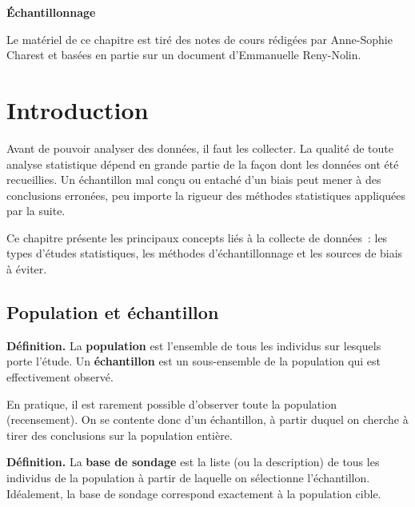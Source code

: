 \documentclass[11pt,french]{article}
\begin{document}
\begin{center}
  {\LARGE\bfseries Échantillonnage}
\end{center}

\medskip
\begin{center}
  \small{Le matériel de ce chapitre est tiré des notes de cours rédigées par Anne-Sophie Charest et basées en partie sur un document d'Emmanuelle Reny-Nolin.}
\end{center}

\bigskip
\tableofcontents

\newpage

\section{Introduction}

Avant de pouvoir analyser des données, il faut les collecter. La qualité de toute analyse
statistique dépend en grande partie de la façon dont les données ont été recueillies. Un
échantillon mal conçu ou entaché d'un biais peut mener à des conclusions erronées, peu
importe la rigueur des méthodes statistiques appliquées par la suite.

Ce chapitre présente les principaux concepts liés à la collecte de données~: les types
d'études statistiques, les méthodes d'échantillonnage et les sources de biais à éviter.

\subsection{Population et échantillon}

\textbf{Définition.} La \textbf{population} est l'ensemble de tous les individus sur lesquels
porte l'étude. Un \textbf{échantillon} est un sous-ensemble de la population qui est
effectivement observé.

En pratique, il est rarement possible d'observer toute la population (recensement). On se
contente donc d'un échantillon, à partir duquel on cherche à tirer des conclusions sur la
population entière.

\textbf{Définition.} La \textbf{base de sondage} est la liste (ou la description) de tous les
individus de la population à partir de laquelle on sélectionne l'échantillon. Idéalement,
la base de sondage correspond exactement à la population cible.
\end{document}
